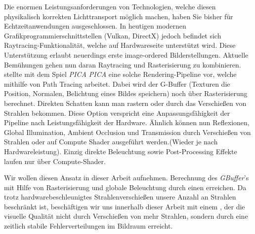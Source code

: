         Die enormen Leistungsanforderungen von Technologien, welche diesen physikalisch korrekten Lichttransport möglich machen, haben Sie bisher für Echtzeitanwendungen ausgeschlossen.
        In heutigen modernen Grafikprogrammierschnittstellen (Vulkan, DirectX) jedoch befindet sich Raytracing-Funktionalität, welche auf Hardwareseite unterstützt wird.
        Diese Unterstützung erlaubt neuerdings erste image-ordered Bilderstellungen.  
        Aktuelle Bemühungen gehen nun daran Raytracing und Rasterisierung zu kombinieren. \cite{Barre-Brisebois2019} stellte
        mit dem Spiel \textit{PICA PICA} eine solche Rendering-Pipeline vor, welche mithilfe von Path Tracing arbeitet. Dabei wird der G-Buffer
        (Texturen die Position, Normalen, Belichtung eines Bildes speichern) noch über Rasterisierung berechnet. Direkten Schatten kann man 
        rastern oder durch das Verschießen von Strahlen bekommen. Diese Option verspricht eine Anpassungsfähigkeit der Pipeline nach Leistungsfähigkeit der Hardware. Ähnlich können nun
        Reflexionen, Global Illumination, Ambient Occlusion und Transmission durch Verschießen von Strahlen oder auf Compute Shader ausgeführt werden.(Wieder je nach 
        Hardwareleistung). Einzig direkte Beleuchtung sowie Post-Processing Effekte laufen nur über Compute-Shader. \par

        Wir wollen diesen Ansatz in dieser Arbeit aufnehmen. Berechnung des \textit{GBuffer}'s mit Hilfe von Rasterisierung und globale Beleuchtung durch 
        einen  erreichen. Da trotz hardwarebeschleunigtes Strahlenverschießen unsere Anzahl an Strahlen beschränkt ist, 
        beschäftigen wir uns innerhalb dieser Arbeit mit einem , der die visuelle Qualität nicht durch Verschießen von mehr Strahlen, 
        sondern durch eine zeitlich stabile  Fehlerverteilungen im Bildraum erreicht.